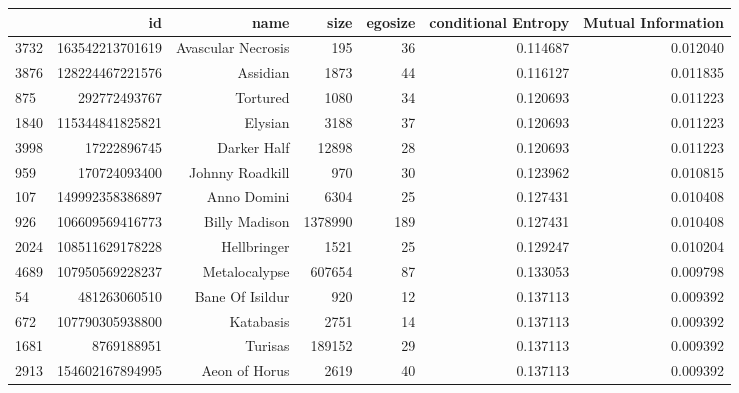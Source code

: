 \cleardoublepage
\begin{table}
\begin{tabular}{| >{\small}l | >{\small}r | >{\small}r | >{\small}r | >{\small}r | >{\small}r |>{\small}r |}
\hline
{} &               id &                   name &     size &  egosize &  conditional Entropy &  Mutual Information \\
\hline
3732 &  163542213701619 &     Avascular Necrosis &      195 &       36 &             0.114687 &            0.012040 \\
3876 &  128224467221576 &               Assidian &     1873 &       44 &             0.116127 &            0.011835 \\
875  &     292772493767 &               Tortured &     1080 &       34 &             0.120693 &            0.011223 \\
1840 &  115344841825821 &                Elysian &     3188 &       37 &             0.120693 &            0.011223 \\
3998 &      17222896745 &            Darker Half &    12898 &       28 &             0.120693 &            0.011223 \\
959  &     170724093400 &        Johnny Roadkill &      970 &       30 &             0.123962 &            0.010815 \\
107  &  149992358386897 &            Anno Domini &     6304 &       25 &             0.127431 &            0.010408 \\
926  &  106609569416773 &          Billy Madison &  1378990 &      189 &             0.127431 &            0.010408 \\
2024 &  108511629178228 &            Hellbringer &     1521 &       25 &             0.129247 &            0.010204 \\
4689 &  107950569228237 &          Metalocalypse &   607654 &       87 &             0.133053 &            0.009798 \\
54   &     481263060510 &        Bane Of Isildur &      920 &       12 &             0.137113 &            0.009392 \\
672  &  107790305938800 &              Katabasis &     2751 &       14 &             0.137113 &            0.009392 \\
1681 &       8769188951 &                Turisas &   189152 &       29 &             0.137113 &            0.009392 \\
2913 &  154602167894995 &          Aeon of Horus &     2619 &       40 &             0.137113 &            0.009392 \\

\end{tabular}
\end{table}
